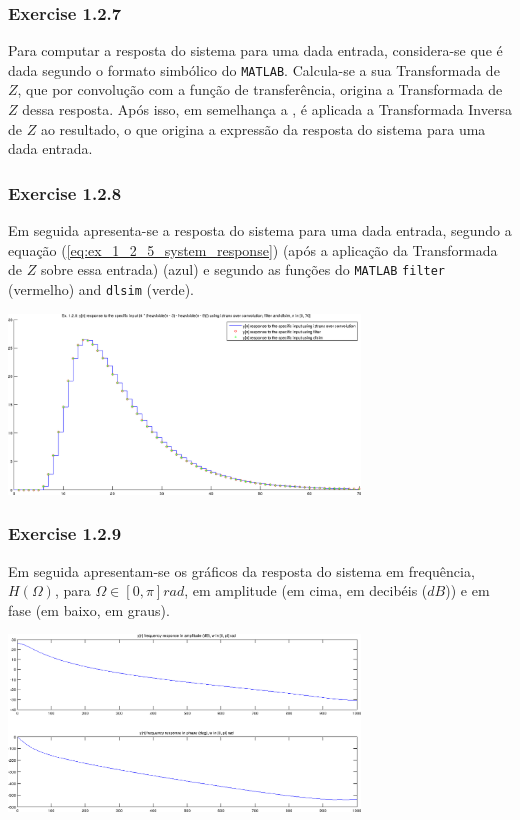 \documentclass[a4paper]{article}
\begin{document}
\subsubsection{Exercise 1.2.7}
\noindent Para computar a resposta do sistema para uma dada entrada, considera-se que é dada segundo o formato simbólico do \texttt{MATLAB}. Calcula-se a sua Transformada de $Z$, que por convolução com a função de transferência, origina a Transformada de $Z$ dessa resposta. Após isso, em semelhança a , é aplicada a Transformada Inversa de $Z$ ao resultado, o que origina a expressão da resposta do sistema para uma dada entrada.

\subsubsection{Exercise 1.2.8}
\noindent Em seguida apresenta-se a resposta do sistema para uma dada entrada, segundo a equação (\ref{eq:ex_1_2_5_system_response}) (após a aplicação da Transformada de $Z$ sobre essa entrada) (azul) e segundo as funções do \texttt{MATLAB} \texttt{filter} (vermelho) and \texttt{dlsim} (verde).
\begin{center}
	\includegraphics[width=0.70\textwidth]{images/ex1_2_8.png}
	\label{fig:ex1_2_8}
\end{center}

\subsubsection{Exercise 1.2.9}
\noindent Em seguida apresentam-se os gráficos da resposta do sistema em frequência, $H(\Omega)$, para $\Omega \in [0, \pi] rad$, em amplitude (em cima, em decibéis ($dB$)) e em fase (em baixo, em graus).
\begin{center}
	\includegraphics[width=0.70\textwidth]{images/ex1_2_9.png}
	\label{fig:ex1_2_9}
\end{center}
\end{document}

